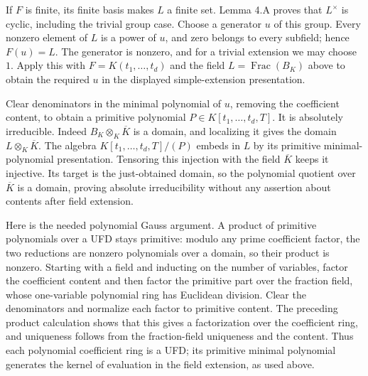 \documentclass[11pt,a4paper,openany]{report}
\begin{document}
If \(F\) is finite, its finite basis makes \(L\) a finite set. Lemma 4.A proves that \(L^\times\) is cyclic, including the trivial group case. Choose a generator \(u\) of this group. Every nonzero element of \(L\) is a power of \(u\), and zero belongs to every subfield; hence \(F(u)=L\). The generator is nonzero, and for a trivial extension we may choose \(1\). Apply this with \(F=K(t_1,\ldots,t_d)\) and the field \(L=\operatorname{Frac}(B_K)\) above to obtain the required \(u\) in the displayed simple-extension presentation.

Clear denominators in the minimal polynomial of \(u\), removing the coefficient content, to obtain a primitive polynomial \(P\in K[t_1,\ldots,t_d,T]\). It is absolutely irreducible. Indeed \(B_K\otimes_K\overline K\) is a domain, and localizing it gives the domain \(L\otimes_K\overline K\). The algebra \(K[t_1,\ldots,t_d,T]/(P)\) embeds in \(L\) by its primitive minimal-polynomial presentation. Tensoring this injection with the field \(\overline K\) keeps it injective. Its target is the just-obtained domain, so the polynomial quotient over \(\overline K\) is a domain, proving absolute irreducibility without any assertion about contents after field extension.

Here is the needed polynomial Gauss argument. A product of primitive polynomials over a UFD stays primitive: modulo any prime coefficient factor, the two reductions are nonzero polynomials over a domain, so their product is nonzero. Starting with a field and inducting on the number of variables, factor the coefficient content and then factor the primitive part over the fraction field, whose one-variable polynomial ring has Euclidean division. Clear the denominators and normalize each factor to primitive content. The preceding product calculation shows that this gives a factorization over the coefficient ring, and uniqueness follows from the fraction-field uniqueness and the content. Thus each polynomial coefficient ring is a UFD; its primitive minimal polynomial generates the kernel of evaluation in the field extension, as used above.
\end{document}
